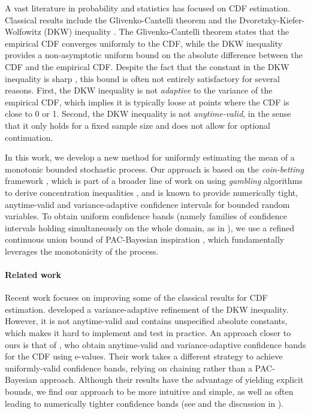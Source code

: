 \documentclass[3p, authoryear, 10pt]{elsarticle}%
\begin{document}
A vast literature in probability and statistics has focused on CDF estimation. Classical results include the Glivenko-Cantelli theorem \citep{glivenko1933sulla, cantelli1933sulla} and the Dvoretzky-Kiefer-Wolfowitz (DKW) inequality \citep{dvoretzky1956asymptotic}. The Glivenko-Cantelli theorem states that the empirical CDF converges uniformly to the CDF, while the DKW inequality provides a non-asymptotic uniform bound on the absolute difference between the CDF and the empirical CDF. Despite the fact that the constant in the DKW inequality is sharp \citep{massart1990tight}, this bound is often not entirely satisfactory for several reasons. First, the DKW inequality is not \emph{adaptive} to the variance of the empirical CDF, which implies it is typically loose at points where the CDF is close to 0 or 1. Second, the DKW inequality is not \emph{anytime-valid}, in the sense that it only holds for a fixed sample size and does not allow for optional continuation.

In this work, we develop a new method for uniformly estimating the mean of a monotonic bounded stochastic process. Our approach is based on the \emph{coin-betting} framework \citep{orabona2023tight, waudbysmith23estimating}, which is part of a broader line of work on using \emph{gambling} algorithms to derive concentration inequalities \citep{shafer2019game}, and is known to provide numerically tight, anytime-valid and variance-adaptive confidence intervals for bounded random variables. To obtain uniform confidence bands (namely families of confidence intervals holding simultaneously on the whole domain, as in ), we use a refined continuous union bound of PAC-Bayesian inspiration \citep{alquier2024user, jang2023tighter}, which fundamentally leverages the monotonicity of the process. 

\paragraph{Related work} 
Recent work focuses on improving some of the classical results for CDF estimation. \citet{bartl2023variance} developed a variance-adaptive refinement of the DKW inequality. However, it is not anytime-valid and contains unspecified absolute constants, which makes it hard to implement and test in practice. An approach closer to ours is that of \citet{howard2022sequential}, who obtain anytime-valid and variance-adaptive confidence bands for the CDF using e-values. Their work takes a different strategy to achieve uniformly-valid confidence bands, relying on chaining rather than a PAC-Bayesian approach. Although their results have the advantage of yielding explicit bounds, we find our approach to be more intuitive and simple, as well as often leading to numerically tighter confidence bands (see  and the discussion in ).
\end{document}
